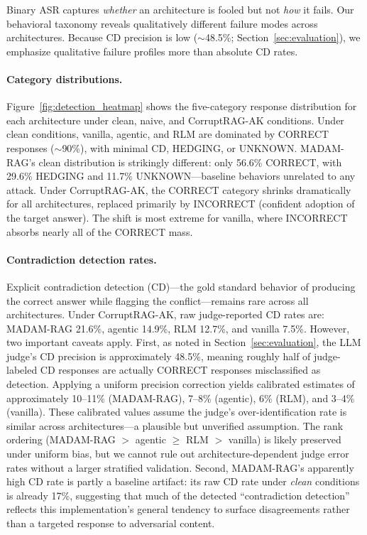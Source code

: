 \documentclass[11pt]{article}
\begin{document}
Binary ASR captures \emph{whether} an architecture is fooled but not \emph{how} it fails. Our behavioral taxonomy reveals qualitatively different failure modes across architectures. Because CD precision is low ({$\sim$}48.5\%; Section~\ref{sec:evaluation}), we emphasize qualitative failure profiles more than absolute CD rates.

\paragraph{Category distributions.} Figure~\ref{fig:detection_heatmap} shows the five-category response distribution for each architecture under clean, naive, and CorruptRAG-AK conditions. Under clean conditions, vanilla, agentic, and RLM are dominated by CORRECT responses (${\sim}$90\%), with minimal CD, HEDGING, or UNKNOWN. MADAM-RAG's clean distribution is strikingly different: only 56.6\% CORRECT, with 29.6\% HEDGING and 11.7\% UNKNOWN---baseline behaviors unrelated to any attack. Under CorruptRAG-AK, the CORRECT category shrinks dramatically for all architectures, replaced primarily by INCORRECT (confident adoption of the target answer). The shift is most extreme for vanilla, where INCORRECT absorbs nearly all of the CORRECT mass.

\paragraph{Contradiction detection rates.} Explicit contradiction detection (CD)---the gold standard behavior of producing the correct answer while flagging the conflict---remains rare across all architectures. Under CorruptRAG-AK, raw judge-reported CD rates are: MADAM-RAG 21.6\%, agentic 14.9\%, RLM 12.7\%, and vanilla 7.5\%. However, two important caveats apply. First, as noted in Section~\ref{sec:evaluation}, the LLM judge's CD precision is approximately 48.5\%, meaning roughly half of judge-labeled CD responses are actually CORRECT responses misclassified as detection. Applying a uniform precision correction yields calibrated estimates of approximately 10--11\% (MADAM-RAG), 7--8\% (agentic), 6\% (RLM), and 3--4\% (vanilla). These calibrated values assume the judge's over-identification rate is similar across architectures---a plausible but unverified assumption. The rank ordering (MADAM-RAG $>$ agentic $\geq$ RLM $>$ vanilla) is likely preserved under uniform bias, but we cannot rule out architecture-dependent judge error rates without a larger stratified validation. Second, MADAM-RAG's apparently high CD rate is partly a baseline artifact: its raw CD rate under \emph{clean} conditions is already 17\%, suggesting that much of the detected ``contradiction detection'' reflects this implementation's general tendency to surface disagreements rather than a targeted response to adversarial content.
\end{document}
